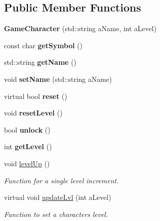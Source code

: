 \subsection*{Public Member Functions}
\begin{DoxyCompactItemize}
\item 
\hypertarget{class_game_character_ad5aee02539362a4d081bb87dd0192995}{}\label{class_game_character_ad5aee02539362a4d081bb87dd0192995} 
{\bfseries Game\+Character} (std\+::string a\+Name, int a\+Level)
\item 
\hypertarget{class_game_character_a175c4c67c7276a9c64833afbccf392ee}{}\label{class_game_character_a175c4c67c7276a9c64833afbccf392ee} 
const char {\bfseries get\+Symbol} ()
\item 
\hypertarget{class_game_character_a1acb3766c648348716a1b162626d6ffa}{}\label{class_game_character_a1acb3766c648348716a1b162626d6ffa} 
std\+::string {\bfseries get\+Name} ()
\item 
\hypertarget{class_game_character_af11d88fb41e0ec3f7711e18e63be62f4}{}\label{class_game_character_af11d88fb41e0ec3f7711e18e63be62f4} 
void {\bfseries set\+Name} (std\+::string a\+Name)
\item 
\hypertarget{class_game_character_ad36b2f145cd55553ded91242a9c929ce}{}\label{class_game_character_ad36b2f145cd55553ded91242a9c929ce} 
virtual bool {\bfseries reset} ()
\item 
\hypertarget{class_game_character_aa989c9d337840ce0f103dc102351b282}{}\label{class_game_character_aa989c9d337840ce0f103dc102351b282} 
void {\bfseries reset\+Level} ()
\item 
\hypertarget{class_game_character_a092512872c1d5e2d41484a6cf82cab81}{}\label{class_game_character_a092512872c1d5e2d41484a6cf82cab81} 
bool {\bfseries unlock} ()
\item 
\hypertarget{class_game_character_a31aa568d3cb993da2592926d49ab5457}{}\label{class_game_character_a31aa568d3cb993da2592926d49ab5457} 
int {\bfseries get\+Level} ()
\item 
void \hyperlink{class_game_character_a367a537148a995677d9649b975cb326b}{level\+Up} ()
\begin{DoxyCompactList}\small\item\em Function for a single level increment. \end{DoxyCompactList}\item 
virtual void \hyperlink{class_game_character_a0e6839e7c79e97ba7daea9ed0fc2569e}{update\+Lvl} (int a\+Level)
\begin{DoxyCompactList}\small\item\em Function to set a characters level. \end{DoxyCompactList}\item 

\end{DoxyCompactItemize}
